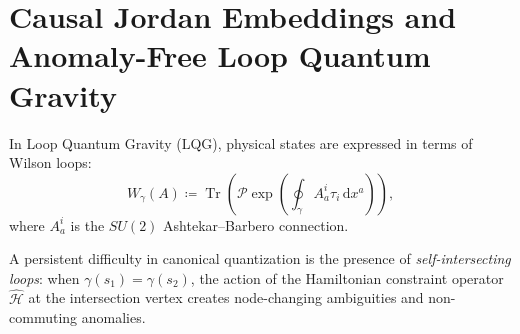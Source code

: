 \documentclass[11pt,a4paper,reqno]{amsart}
\theoremstyle{definition}
\numberwithin{equation}{section}
\newcommand{\Tr}{\operatorname{Tr}}
\newcommand{\dif}{\,\mathrm{d}}
\begin{document}
\section{Causal Jordan Embeddings and Anomaly-Free Loop Quantum Gravity}
\label{sec:jordan_lqg}

In Loop Quantum Gravity (LQG), physical states are expressed in terms of Wilson loops:
\begin{equation}
    \label{eq:wilson_loop_operator}
    W_\gamma(A) \coloneqq \Tr\left( \mathcal{P} \exp\left( \oint_\gamma A_a^i \tau_i \dif x^a \right) \right),
\end{equation}
where $A_a^i$ is the $SU(2)$ Ashtekar--Barbero connection.

A persistent difficulty in canonical quantization is the presence of \emph{self-intersecting loops}: when $\gamma(s_1) = \gamma(s_2)$, the action of the Hamiltonian constraint operator $\widehat{\mathcal{H}}$ at the intersection vertex creates node-changing ambiguities and non-commuting anomalies.
\end{document}
